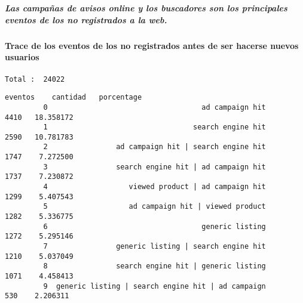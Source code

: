 \documentclass[11pt]{article}
\begin{document}
    \begin{center}
    \end{center}
    { \hspace*{\fill} \\}
    
    \hypertarget{las-campauxf1as-de-avisos-online-y-los-buscadores-son-los-principales-eventos-de-los-no-registrados-a-la-web.}{%
\subparagraph{Las campañas de avisos online y los buscadores son los
principales eventos de los no registrados a la
web.}\label{las-campauxf1as-de-avisos-online-y-los-buscadores-son-los-principales-eventos-de-los-no-registrados-a-la-web.}}

   
    \hypertarget{trace-de-los-eventos-de-los-no-registrados-antes-de-ser-hacerse-nuevos-usuarios}{%
\paragraph{Trace de los eventos de los no registrados antes de ser
hacerse nuevos
usuarios}\label{trace-de-los-eventos-de-los-no-registrados-antes-de-ser-hacerse-nuevos-usuarios}}


    \begin{Verbatim}[commandchars=\\\{\}]
Total :  24022
    \end{Verbatim}

\begin{Verbatim}[commandchars=\\\{\}]
                                                    eventos    cantidad   porcentage
         0                                    ad campaign hit      4410   18.358172
         1                                  search engine hit      2590   10.781783
         2                ad campaign hit | search engine hit      1747    7.272500
         3                search engine hit | ad campaign hit      1737    7.230872
         4                   viewed product | ad campaign hit      1299    5.407543
         5                   ad campaign hit | viewed product      1282    5.336775
         6                                    generic listing      1272    5.295146
         7                generic listing | search engine hit      1210    5.037049
         8                search engine hit | generic listing      1071    4.458413
         9  generic listing | search engine hit | ad campaign       530    2.206311
\end{Verbatim}
            
\end{document}
